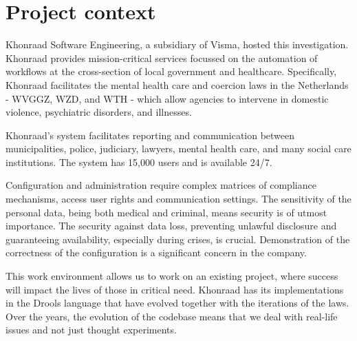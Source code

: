 \section{Project context}

Khonraad Software Engineering, a subsidiary of Visma, hosted this investigation.
Khonraad provides mission-critical services focussed on the automation of workflows at the cross-section of local government and healthcare.
Specifically, Khonraad facilitates the mental health care and coercion laws in the Netherlands - WVGGZ, WZD, and WTH - which allow agencies to intervene in domestic violence, psychiatric disorders, and illnesses.

Khonraad's system facilitates reporting and communication between municipalities, police, judiciary, lawyers, mental health care, and many social care institutions.
The system has 15,000 users and is available 24/7.

Configuration and administration require complex matrices of compliance mechanisms, access user rights and communication settings.
The sensitivity of the personal data, being both medical and criminal, means security is of utmost importance.
The security against data loss, preventing unlawful disclosure and guaranteeing availability, especially during crises, is crucial.
Demonstration of the correctness of the configuration is a significant concern in the company.

This work environment allows us to work on an existing project, where success will impact the lives of those in critical need.
Khonraad has its implementations in the Drools language that have evolved together with the iterations of the laws.
Over the years, the evolution of the codebase means that we deal with real-life issues and not just thought experiments.